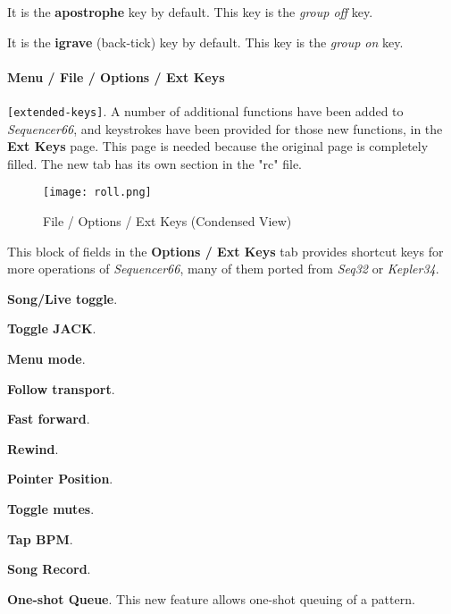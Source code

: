    It is the \textbf{apostrophe} key by default.
   This key is the \textsl{group off} key.

   It is the \textbf{igrave} (back-tick) key by default.
   This key is the \textsl{group on} key.

\paragraph{Menu / File / Options / Ext Keys }
\label{paragraph:seq66_menu_file_options_ext_keys}

   \texttt{[extended-keys]}.
   A number of additional functions have been added to \textsl{Sequencer66},
   and keystrokes have been provided for those new functions, in the
   \textbf{Ext Keys} page.  This page is needed because the original page is
   completely filled.  The new tab has its own section in the "rc" file.

\begin{figure}[H]
   \centering 
   \texttt{[image: roll.png]}
   \caption{File / Options / Ext Keys (Condensed View)}
   \label{fig:seq66_menu_file_options_ext_keys}
\end{figure}


   \setcounter{ItemCounter}{0}      %

   This block of fields in the \textbf{Options / Ext Keys} tab
   provides shortcut keys for more operations of \textsl{Sequencer66}, many of
   them ported from \textsl{Seq32} or \textsl{Kepler34}.

   \begin{enumber}
      \item \textbf{Song/Live toggle}.
      \item \textbf{Toggle JACK}.
      \item \textbf{Menu mode}.
      \item \textbf{Follow transport}.
      \item \textbf{Fast forward}.
      \item \textbf{Rewind}.
      \item \textbf{Pointer Position}.
      \item \textbf{Toggle mutes}.
      \item \textbf{Tap BPM}.
      \item \textbf{Song Record}.
      \item \textbf{One-shot Queue}.
         This new feature allows one-shot queuing of a pattern.
   \end{enumber}


